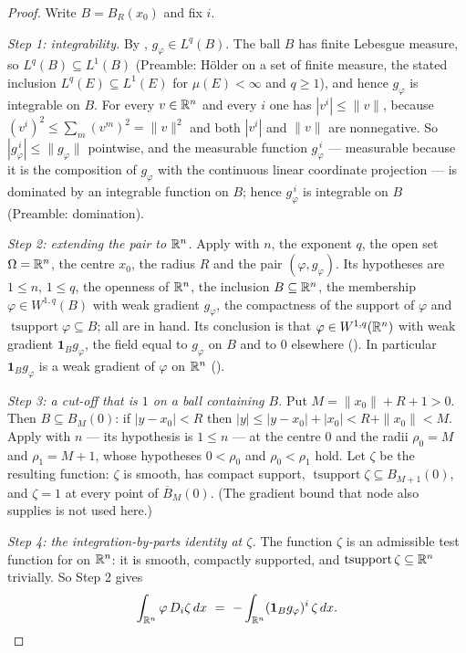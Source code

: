 \begin{proof}
Write $B=B_R(x_0)$ and fix $i$.

\emph{Step 1: integrability.}  By , $g_\varphi\in L^{q}(B)$.
The ball $B$ has finite Lebesgue measure, so $L^{q}(B)\subseteq L^{1}(B)$
(Preamble: H\"older on a set of finite measure, the stated inclusion
$L^{q}(E)\subseteq L^{1}(E)$ for $\mu(E)<\infty$ and $q\ge1$), and hence
$g_\varphi$ is integrable on $B$.  For every $v\in\mathbb{R}^n$ and every $i$ one has
$|v^i|\le\|v\|$, because $(v^i)^2\le\sum_m(v^m)^2=\|v\|^2$ and both
$|v^i|$ and $\|v\|$ are nonnegative.  So
$|g_\varphi^{\,i}|\le\|g_\varphi\|$ pointwise, and the measurable function
$g_\varphi^{\,i}$ --- measurable because it is the composition of $g_\varphi$
with the continuous linear coordinate projection --- is dominated by an
integrable function on $B$; hence $g_\varphi^{\,i}$ is integrable on $B$
(Preamble: domination).

\emph{Step 2: extending the pair to $\mathbb{R}^n$.}  Apply
 with $n$, the exponent $q$, the open set
$\Omega=\mathbb{R}^n$, the centre $x_0$, the radius $R$ and the pair
$(\varphi,g_\varphi)$.  Its hypotheses are $1\le n$, $1\le q$, the openness of
$\mathbb{R}^n$, the inclusion $B\subseteq\mathbb{R}^n$, the membership
$\varphi\in W^{1,q}(B)$ with weak gradient $g_\varphi$, the compactness of the
support of $\varphi$ and $\operatorname{tsupport}\varphi\subseteq B$; all are in
hand.  Its conclusion is that
$\varphi\in W^{1,q}(\mathbb{R}^n)$ with weak gradient $\mathbf1_Bg_\varphi$, the field
equal to $g_\varphi$ on $B$ and to $0$ elsewhere ().  In
particular $\mathbf1_Bg_\varphi$ is a weak gradient of $\varphi$ on $\mathbb{R}^n$
().

\emph{Step 3: a cut-off that is $1$ on a ball containing $B$.}  Put
$M=\|x_0\|+R+1>0$.  Then $B\subseteq B_M(0)$: if $|y-x_0|<R$ then
$|y|\le|y-x_0|+|x_0|<R+\|x_0\|<M$.  Apply  with
$n$ --- its hypothesis is $1\le n$ --- at the centre $0$ and the radii
$\rho_0=M$ and $\rho_1=M+1$, whose hypotheses $0<\rho_0$ and $\rho_0<\rho_1$
hold.  Let $\zeta$ be the resulting function: $\zeta$ is smooth, has compact
support, $\operatorname{tsupport}\zeta\subseteq B_{M+1}(0)$, and $\zeta=1$ at
every point of $\overline B_M(0)$.  (The gradient bound that node also supplies
is not used here.)

\emph{Step 4: the integration-by-parts identity at $\zeta$.}  The function
$\zeta$ is an admissible test function for  on
$\mathbb{R}^n$: it is smooth, compactly supported, and
$\operatorname{tsupport}\zeta\subseteq\mathbb{R}^n$ trivially.  So Step 2 gives
\[
\int_{\R^n}\varphi\,D_i\zeta\,dx\ =\ -\int_{\R^n}(\mathbf1_Bg_\varphi)^i\,\zeta\,dx .
\]


\end{proof}
